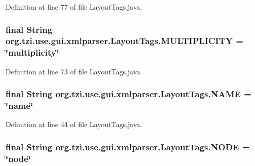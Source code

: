 Definition at line 77 of file Layout\-Tags.\-java.

\hypertarget{classorg_1_1tzi_1_1use_1_1gui_1_1xmlparser_1_1_layout_tags_acd1fd0cb04685ab57ffa3f59e11a2976}{
\subsubsection[{M\-U\-L\-T\-I\-P\-L\-I\-C\-I\-T\-Y}]{\setlength{\rightskip}{0pt plus 5cm}final String org.\-tzi.\-use.\-gui.\-xmlparser.\-Layout\-Tags.\-M\-U\-L\-T\-I\-P\-L\-I\-C\-I\-T\-Y = \char`\"{}multiplicity\char`\"{}\hspace{0.3cm}{\ttfamily [static]}}}\label{classorg_1_1tzi_1_1use_1_1gui_1_1xmlparser_1_1_layout_tags_acd1fd0cb04685ab57ffa3f59e11a2976}


Definition at line 73 of file Layout\-Tags.\-java.

\hypertarget{classorg_1_1tzi_1_1use_1_1gui_1_1xmlparser_1_1_layout_tags_a9abf3d70ede950e50585fd886fbf2ed6}{
\subsubsection[{N\-A\-M\-E}]{\setlength{\rightskip}{0pt plus 5cm}final String org.\-tzi.\-use.\-gui.\-xmlparser.\-Layout\-Tags.\-N\-A\-M\-E = \char`\"{}name\char`\"{}\hspace{0.3cm}{\ttfamily [static]}}}\label{classorg_1_1tzi_1_1use_1_1gui_1_1xmlparser_1_1_layout_tags_a9abf3d70ede950e50585fd886fbf2ed6}


Definition at line 44 of file Layout\-Tags.\-java.

\hypertarget{classorg_1_1tzi_1_1use_1_1gui_1_1xmlparser_1_1_layout_tags_a13c186a72b0fd89b66c2790bd1903320}{
\subsubsection[{N\-O\-D\-E}]{\setlength{\rightskip}{0pt plus 5cm}final String org.\-tzi.\-use.\-gui.\-xmlparser.\-Layout\-Tags.\-N\-O\-D\-E = \char`\"{}node\char`\"{}\hspace{0.3cm}{\ttfamily [static]}}}\label{classorg_1_1tzi_1_1use_1_1gui_1_1xmlparser_1_1_layout_tags_a13c186a72b0fd89b66c2790bd1903320}


